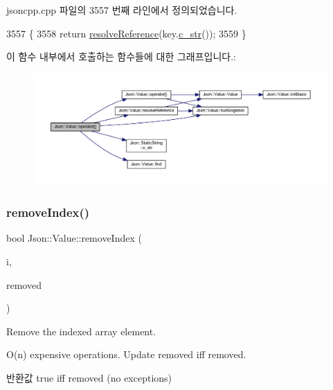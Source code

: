 jsoncpp.\+cpp 파일의 3557 번째 라인에서 정의되었습니다.


\begin{DoxyCode}
3557                                                 \{
3558   \textcolor{keywordflow}{return} \hyperlink{class_json_1_1_value_a9ff9cdae2c8f4155bab603d750b0b3f1}{resolveReference}(key.\hyperlink{class_json_1_1_static_string_ad6be703d432d108623bb0aa06b0b90ca}{c\_str}());
3559 \}
\end{DoxyCode}
이 함수 내부에서 호출하는 함수들에 대한 그래프입니다.\+:\nopagebreak
\begin{figure}[H]
\begin{center}
\leavevmode
\includegraphics[width=350pt]{class_json_1_1_value_ac3763d7d315ca65dc188e273722f7955_cgraph}
\end{center}
\end{figure}
\mbox{\label{class_json_1_1_value_ae9e67e08a85a2f3be3396ec0f4c47f65}} 
\subsubsection{\texorpdfstring{remove\+Index()}{removeIndex()}}
{\footnotesize\ttfamily bool Json\+::\+Value\+::remove\+Index (\begin{DoxyParamCaption}\item[{\hyperlink{class_json_1_1_value_a184a91566cccca7b819240f0d5561c7d}{Array\+Index}}]{i,  }\item[{\hyperlink{class_json_1_1_value}{Value} $\ast$}]{removed }\end{DoxyParamCaption})}



Remove the indexed array element. 

O(n) expensive operations. Update \textquotesingle{}removed\textquotesingle{} iff removed. \begin{DoxyReturn}{반환값}
true iff removed (no exceptions) 
\end{DoxyReturn}


